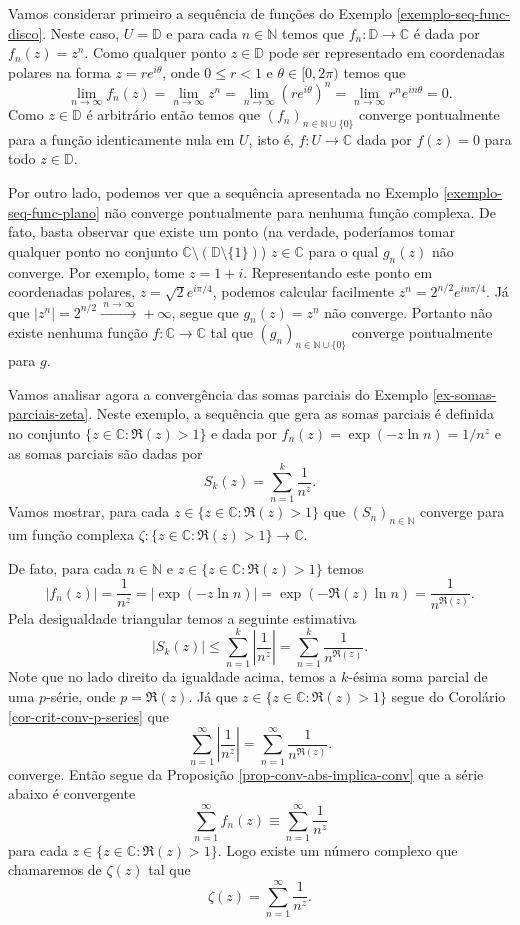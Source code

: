 Vamos considerar primeiro a sequência de funções do Exemplo \ref{exemplo-seq-func-disco}.
Neste caso, $U=\mathbb{D}$ e para cada $n\in\mathbb{N}$ temos que 
$f_n:\mathbb{D}\to\mathbb{C}$ é dada por $f_n(z)=z^n$. Como qualquer ponto $z\in\mathbb{D}$
pode ser representado em coordenadas polares na forma $z=re^{i\theta}$, onde $0\leqslant r< 1$
e $\theta\in [0,2\pi)$ temos que 
\[
\lim_{n\to\infty} f_n(z) 
= 
\lim_{n\to\infty} z^n 
=
\lim_{n\to\infty} (re^{i\theta})^n
=
\lim_{n\to\infty}r^n e^{in\theta}=0.
\]
Como $z\in\mathbb{D}$ é arbitrário então temos que $(f_n)_{n\in\mathbb{N}\cup\{0\}}$ 
converge pontualmente para a função identicamente nula em $U$, isto é, 
$f:U\to\mathbb{C}$ dada por $f(z)=0$ para todo $z\in\mathbb{D}$.

Por outro lado, podemos ver que a sequência apresentada no Exemplo 
\ref{exemplo-seq-func-plano} não converge pontualmente para nenhuma função 
complexa. De fato, basta observar que existe um ponto 
(na verdade, poderíamos tomar qualquer ponto no conjunto $\mathbb{C}\setminus (\mathbb{D}\setminus\{1\})$) $z\in \mathbb{C}$ para o qual $g_n(z)$ não converge. Por exemplo, tome 
$z=1+i$. Representando este ponto em coordenadas polares, $z=\sqrt{2}e^{i\pi/4}$,
podemos calcular facilmente $z^n = 2^{n/2}e^{in\pi/4}$. 
Já que $|z^n|=2^{n/2}\xrightarrow{\ n\to\infty\ }+\infty$,
segue que $g_n(z)=z^n$ não converge. Portanto não existe nenhuma função $f:\mathbb{C}\to\mathbb{C}$
tal que $(g_n)_{n\in\mathbb{N}\cup\{0\}}$ converge pontualmente para $g$.


\medskip 

Vamos analisar agora a convergência das somas 
parciais do Exemplo \ref{ex-somas-parciais-zeta}.
Neste exemplo, a sequência que gera as somas parciais é definida no 
conjunto $\{z\in\mathbb{C}: \Re(z)>1\}$ e dada por $f_n(z)= \exp(-z\ln n) = 1/n^z$
e as somas parciais são dadas por 
\[
S_k(z) = \sum_{n=1}^{k}\frac{1}{n^z}.
\]
Vamos mostrar, para cada $z\in\{z\in\mathbb{C}: \Re(z)>1\}$ 
que  $(S_n)_{n\in\mathbb{N}}$ converge para um função complexa
$\zeta:\{z\in\mathbb{C}: \Re(z)>1\}\to\mathbb{C}$. 

De fato, para cada $n\in\mathbb{N}$ e $z\in\{z\in\mathbb{C}: \Re(z)>1\}$ 
temos
\[
|f_n(z)| = \frac{1}{n^z}  = |\exp(-z\ln n)| = \exp(-\Re(z)\ln n) = \frac{1}{n^{\Re(z)}}.
\]
Pela desigualdade triangular temos a seguinte estimativa 
\[
|S_k(z)| 
\leq 
\sum_{n=1}^{k}\left|\frac{1}{n^z}\right|
=
\sum_{n=1}^{k} \frac{1}{n^{\Re(z)}}.
\]
Note que no lado direito da igualdade acima, temos a $k$-ésima soma parcial
de uma $p$-série, onde $p=\Re(z)$. 
Já que $z\in\{z\in\mathbb{C}: \Re(z)>1\}$ segue do Corolário \ref{cor-crit-conv-p-series} 
que 
\[
\sum_{n=1}^{\infty}\left|\frac{1}{n^z}\right|
=
\sum_{n=1}^{\infty} \frac{1}{n^{\Re(z)}}.
\]
converge. Então segue da Proposição \ref{prop-conv-abs-implica-conv} que a série
abaixo é convergente
\[
\sum_{n=1}^{\infty} f_n(z) \equiv \sum_{n=1}^{\infty} \frac{1}{n^z}
\]
para cada $z\in\{z\in\mathbb{C}: \Re(z)>1\}$. Logo
existe um número complexo que chamaremos de 
$\zeta(z)$ tal que 
\[
\zeta(z) = \sum_{n=1}^{\infty} \frac{1}{n^z}.
\]

